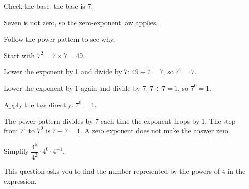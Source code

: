\begin{steps}
  \item Check the base: the base is 7.
  \item Seven is not zero, so the zero-exponent law applies.
  \item Follow the power pattern to see why.
  \item Start with $7^{2} = 7 \times 7 = 49$.
  \item Lower the exponent by 1 and divide by 7: $49 \div 7 = 7$, so $7^{1} = 7$.
  \item Lower the exponent by 1 again and divide by 7: $7 \div 7 = 1$, so
    $7^{0} = 1$.
  \item Apply the law directly: $7^{0} = 1$.
\end{steps}


The power pattern divides by 7 each time the exponent drops by 1. The step from
$7^{1}$ to $7^{0}$ is $7 \div 7 = 1$. A zero exponent does not make the answer
zero.


Simplify $\dfrac{4^{5}}{4^{2}} \cdot 4^{0} \cdot 4^{-1}$.


This question asks you to find the number represented by the powers of 4 in the
expression.

